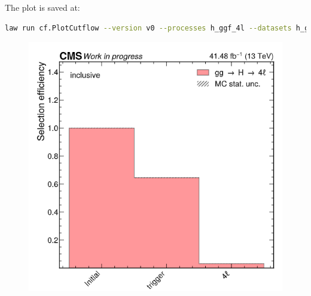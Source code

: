 The plot is saved at:
\begin{lstlisting}[language=bash]
law run cf.PlotCutflow --version v0 --processes h_ggf_4l --datasets h_ggf_4l_powheg --selector-steps trigger,four_leptons --shape-norm --print-output 0
\end{lstlisting}

\begin{figure}[!h]
    \centering
    \includegraphics[scale=0.5]{images/cutflow.png}
\end{figure}
